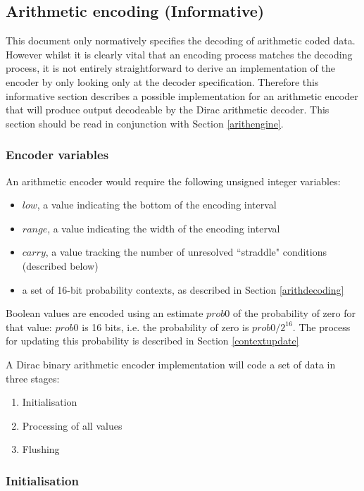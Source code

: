 \begin{informative*}
\subsection{Arithmetic encoding (Informative)}

This document only normatively specifies the decoding of arithmetic coded data. 
However whilst it is clearly vital that an encoding process matches the decoding
process, it is not entirely straightforward to derive an implementation of the
encoder by only looking only at the decoder specification. Therefore this
informative section describes a possible implementation for an
arithmetic encoder that will produce output decodeable by
the Dirac arithmetic decoder. This section should be read in conjunction with
Section \ref{arithengine}.

\subsubsection{Encoder variables}

An arithmetic encoder would require the following unsigned integer variables:
\begin{itemize}
\item $low$, a value indicating the bottom of the encoding interval
\item $range$, a value indicating the width of the encoding interval
\item $carry$, a value tracking the number of unresolved ``straddle" conditions 
(described below)
\item a set of 16-bit probability contexts, as described in Section \ref{arithdecoding}
\end{itemize}

Boolean values are encoded using an estimate $prob0$ of the probability of zero
for that value: $prob0$ is 16 bits, i.e. the probability of zero is $prob0/2^{16}$. 
The process for updating this probability is described in Section \ref{contextupdate}

A Dirac binary arithmetic encoder implementation will code a set of data in three stages:
\begin{enumerate}
\item Initialisation
\item Processing of all values
\item Flushing
\end{enumerate}

\subsubsection{Initialisation}


\end{informative*}
